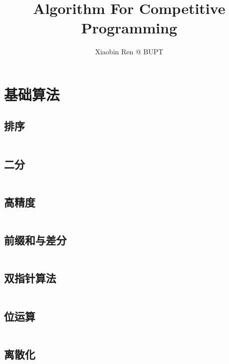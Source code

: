 \documentclass[a4paper,12pt]{article}
\author{Xiaobin Ren @ BUPT}
\title{Algorithm For Competitive Programming}
\begin{document}
\maketitle %
\thispagestyle{empty} %
\newpage %
\tableofcontents %


\newpage
\section{基础算法}
\subsection{排序}
\inputminted[breaklines, linenos]{c++}{basic/sort.cc}
\subsection{二分}
\inputminted[breaklines, linenos]{c++}{basic/binary_search.cc}
\subsection{高精度}
\inputminted[breaklines, linenos]{c++}{basic/high_precision.cc}
\subsection{前缀和与差分}
\inputminted[breaklines, linenos]{c++}{basic/prefixsum_diff.cc}
\subsection{双指针算法}
\inputminted[breaklines, linenos]{c++}{basic/double_pointer.cc}
\subsection{位运算}
\inputminted[breaklines, linenos]{c++}{basic/bit.cc}
\subsection{离散化}
\inputminted[breaklines, linenos]{c++}{basic/disc.cc}
\end{document}
